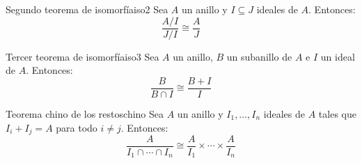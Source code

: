 \begin{theorem}{Segundo teorema de isomorfía}{iso2}
    Sea \(A\) un anillo y \(I \subseteq J\) ideales de \(A\). Entonces:
    \[
    \frac{A/I}{J/I} \cong \frac{A}{J}
    \]
\end{theorem}

\begin{theorem}{Tercer teorema de isomorfía}{iso3}
    Sea \(A\) un anillo, \(B\) un subanillo de \(A\) e \(I\) un ideal de \(A\). Entonces:
    \[
    \frac{B}{B \cap I} \cong \frac{B + I}{I}
    \]
\end{theorem}

\begin{theorem}{Teorema chino de los restos}{chino}
    Sea \(A\) un anillo y \(I_1, \ldots, I_n\) ideales de \(A\) tales que \(I_i + I_j = A\) para todo \(i \neq j\). Entonces:
    \[
    \frac{A}{I_1 \cap \cdots \cap I_n} \cong \frac{A}{I_1} \times \cdots \times \frac{A}{I_n}
    \]
\end{theorem}